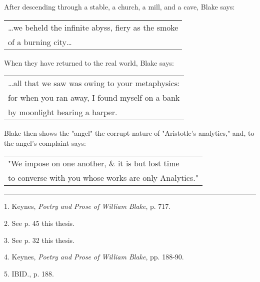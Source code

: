 \hspace*{5mm}After descending through a stable, a church, a mill, and a cave, Blake says:
\begin{center}
	\parbox{0.8\textwidth}{
		\centering
		\begin{tabular}{l}
			\dots we beheld the infinite abyss, fiery as the smoke \\
			of a burning city\dots
		\end{tabular}
	}%
\end{center}
\hspace*{5mm}When they have returned to the real world, Blake says:\par
\begin{center}
	\parbox{0.8\textwidth}{
		\centering
		\begin{tabular}{l}
			\dots all that we saw was owing to your metaphysics: \\
			for when you ran away, I found myself on a bank      \\
			by moonlight hearing a harper.
		\end{tabular}
	}%
\end{center}
\hspace*{5mm}Blake then shows the "angel" the corrupt nature of "Aristotle's analytics," and, to the angel's complaint says:\par
\begin{center}
	\parbox{0.8\textwidth}{
		\centering
		\begin{tabular}{l}
			"We impose on one another, \& it is but lost time \\
			to converse with you whose works are only Analytics."
		\end{tabular}
	}%
\end{center}
\vspace*{\fill}
\noindent\rule{0.25\textwidth}{0.4pt}\par
1. Keynes, \textit{Poetry and Prose of William Blake}, p. 717.\par
2. See p. 45 this thesis.\par
3. See p. 32 this thesis.\par
4. Keynes, \textit{Poetry and Prose of William Blake}, pp. 188-90.\par
5. IBID., p. 188.\par

\newpage

{}

